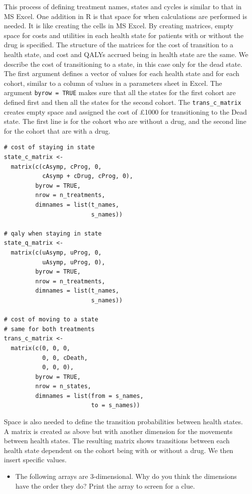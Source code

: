 This process of defining treatment names, states and cycles is similar to that in MS Excel. One addition in R is that space for when calculations are performed is needed. It is like creating the cells in MS Excel. By creating matrices, empty space for costs and utilities in each health state for patients with or without the drug is specified. The structure of the matrices for the cost of transition to a health state, and cost and QALYs accrued being in health state are the same. We describe the cost of transitioning to a state, in this case only for the dead state. The first argument defines a vector of values for each health state and for each cohort, similar to a column of values in a parameters sheet in Excel.
The argument \texttt{byrow = TRUE} makes sure that all the states for the first cohort are defined first and then all the states for the second cohort.
The \texttt{trans\_c\_matrix} creates empty space and assigned the cost of £1000 for transitioning to the Dead state.
The first line is for the cohort who are without a drug, and the second line for the cohort that are with a drug. 

\begin{verbatim}
# cost of staying in state
state_c_matrix <-
  matrix(c(cAsymp, cProg, 0,
           cAsymp + cDrug, cProg, 0),
         byrow = TRUE,
         nrow = n_treatments,
         dimnames = list(t_names,
                         s_names))

# qaly when staying in state
state_q_matrix <-
  matrix(c(uAsymp, uProg, 0,
           uAsymp, uProg, 0),
         byrow = TRUE,
         nrow = n_treatments,
         dimnames = list(t_names,
                         s_names))

# cost of moving to a state
# same for both treatments
trans_c_matrix <-
  matrix(c(0, 0, 0,
           0, 0, cDeath,
           0, 0, 0),
         byrow = TRUE,
         nrow = n_states,
         dimnames = list(from = s_names,
                         to = s_names))
\end{verbatim}

Space is also needed to define the transition probabilities between health states. A matrix is created as above but with another dimension for the movements between health states. The resulting matrix shows transitions between each health state dependent on the cohort being with or without a drug. We then insert specific values.

\begin{itemize}
\item The following arrays are 3-dimensional. Why do you think the dimensions have the order they do? Print the array to screen for a clue.
\end{itemize}

